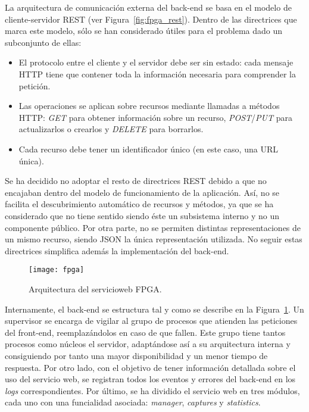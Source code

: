 La arquitectura de comunicación externa del \gls{back-end} se basa en el modelo de cliente-servidor \gls{REST} (ver Figura~\ref{fig:fpga_rest}).
Dentro de las directrices que marca este modelo, sólo se han considerado útiles para el problema dado un subconjunto de ellas:
\begin{itemize}
  \item El protocolo entre el cliente y el servidor debe ser sin estado: cada mensaje \gls{HTTP} tiene que contener toda la información necesaria para comprender la petición.
  \item Las operaciones se aplican sobre recursos mediante llamadas a métodos \gls{HTTP}: \textit{GET} para obtener información sobre un recurso, \textit{POST}/\textit{PUT} para actualizarlos o crearlos y \textit{DELETE} para borrarlos.
  \item Cada recurso debe tener un identificador único (en este caso, una \gls{URL} única).
\end{itemize}

Se ha decidido no adoptar el resto de directrices \gls{REST} debido a que no encajaban dentro del modelo de funcionamiento de la aplicación.
Así, no se facilita el descubrimiento automático de recursos y métodos, ya que se ha considerado que no tiene sentido siendo éste un subsistema interno y no un componente público.
Por otra parte, no se permiten distintas representaciones de un mismo recurso, siendo \gls{JSON} la única representación utilizada.
No seguir estas directrices simplifica además la implementación del \gls{back-end}.

\begin{figure}[!htp]
  \centering
  \texttt{[image: fpga]}
  \caption{Arquitectura del \gls{servicioweb} \gls{FPGA}.}
  \label{fig:arquitectura_servicio}
\end{figure}

Internamente, el \gls{back-end} se estructura tal y como se describe en la Figura~\ref{fig:arquitectura_servicio}.
Un supervisor se encarga de vigilar al grupo de procesos que atienden las peticiones del \gls{front-end}, reemplazándolos en caso de que fallen.
Este grupo tiene tantos procesos como núcleos el servidor, adaptándose así a su arquitectura interna y consiguiendo por tanto una mayor disponibilidad y un menor tiempo de respuesta.
Por otro lado, con el objetivo de tener información detallada sobre el uso del servicio web, se registran todos los eventos y errores del \gls{back-end} en los \textit{logs} correspondientes.
Por último, se ha dividido el servicio web en tres módulos, cada uno con una funcialidad asociada: \textit{manager}, \textit{captures} y \textit{statistics}.

